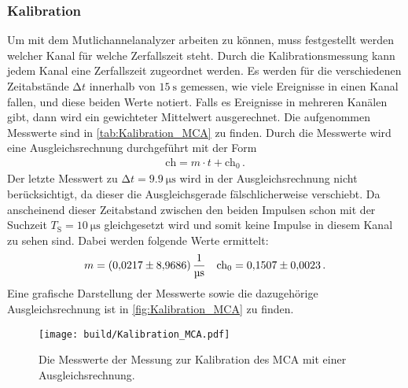   \subsubsection{Kalibration}
  Um mit dem Mutlichannelanalyzer arbeiten zu können, muss festgestellt werden welcher Kanal für welche Zerfallszeit steht.
  Durch die Kalibrationsmessung kann jedem Kanal eine Zerfallszeit zugeordnet werden. Es werden für die verschiedenen Zeitabstände $\increment t$
  innerhalb von $\SI{15}{\second}$ gemessen, wie viele Ereignisse in einen Kanal fallen, und diese beiden Werte notiert. Falls es Ereignisse in mehreren 
  Kanälen gibt, dann wird ein gewichteter Mittelwert ausgerechnet. 
  Die aufgenommen Messwerte sind in \autoref{tab:Kalibration_MCA} zu finden.
  Durch die Messwerte wird eine Ausgleichsrechnung durchgeführt mit der Form
  \begin{align*}
    \text{ch} = m \cdot t + \text{ch}_0 \, .
  \end{align*}
  Der letzte Messwert zu $\increment t = \SI{9.9}{\micro\second}$ wird in der Ausgleichsrechnung nicht berücksichtigt, da dieser die Ausgleichsgerade fälschlicherweise verschiebt.
  Da anscheinend dieser Zeitabstand zwischen den beiden Impulsen schon mit der Suchzeit $T_\text{S} = \SI{10}{\micro\second}$ gleichgesetzt wird und somit keine Impulse in diesem Kanal zu sehen sind.
  Dabei werden folgende Werte ermittelt:
  \begin{align*}
    m = \SI{0.0217 \pm 8.9686}{\per\micro\second} && \text{ch}_0 = \num{0.1507 \pm 0.0023}\, . \\ 
  \end{align*}
  Eine grafische Darstellung der Messwerte sowie die dazugehörige Ausgleichsrechnung ist in \autoref{fig:Kalibration_MCA} zu finden.
  \begin{figure}
    \centering
    \texttt{[image: build/Kalibration\_MCA.pdf]}
    \caption{Die Messwerte der Messung zur Kalibration des MCA mit einer Ausgleichsrechnung.}
    \label{fig:Kalibration_MCA}
  \end{figure}
